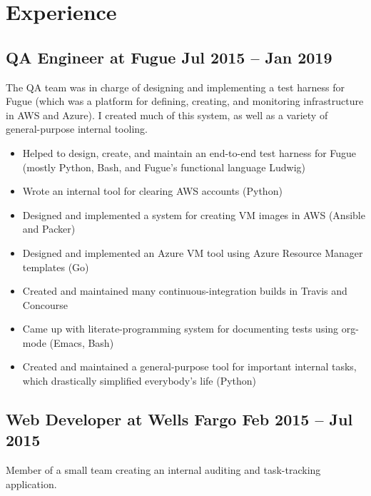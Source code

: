 \documentclass[12pt]{article}
\begin{document}

\section*{Experience}

\subsection*{QA Engineer at Fugue \hfill Jul 2015 -- Jan 2019}

The QA team was in charge of designing and implementing a test harness for Fugue
(which was a platform for defining, creating, and monitoring infrastructure in
AWS and Azure). I created much of this system, as well as a variety of
general-purpose internal tooling.

\begin{itemize}
\item Helped to design, create, and maintain an end-to-end test harness for
  Fugue (mostly Python, Bash, and Fugue's functional language Ludwig)
\item Wrote an internal tool for clearing AWS accounts (Python)
\item Designed and implemented a system for creating VM images in AWS (Ansible
  and Packer)
\item Designed and implemented an Azure VM tool using Azure Resource Manager
  templates (Go)
\item Created and maintained many continuous-integration builds in Travis and
  Concourse
\item Came up with literate-programming system for documenting tests using
  org-mode (Emacs, Bash)
\item Created and maintained a general-purpose tool for important internal
  tasks, which drastically simplified everybody's life (Python)
\end{itemize}

     
 

\subsection*{Web Developer at Wells Fargo \hfill Feb 2015 -- Jul 2015}

Member of a small team creating an internal auditing and task-tracking
application.
\end{document}
